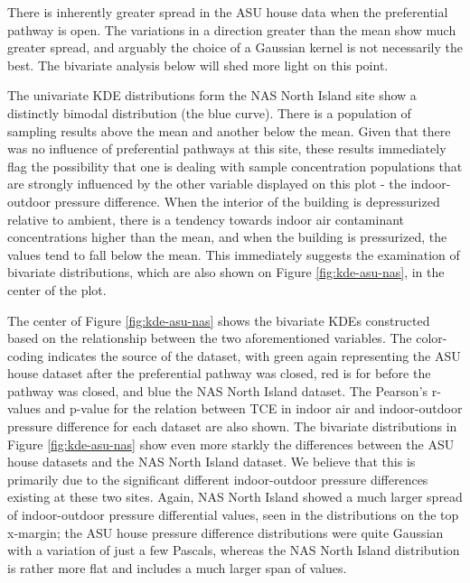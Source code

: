 \documentclass[journal=esthag,manuscript=article]{achemso}
\begin{document}
There is inherently greater spread in the ASU house data when the preferential pathway is open.
The variations in a direction greater than the mean show much greater spread, and arguably the choice of a Gaussian kernel is not necessarily the best.
The bivariate analysis below will shed more light on this point.

The univariate KDE distributions form the NAS North Island site show a distinctly bimodal distribution (the blue curve).
There is a population of sampling results above the mean and another below the mean.
Given that there was no influence of preferential pathways at this site, these results immediately flag the possibility that one is dealing with sample concentration populations that are strongly influenced by the other variable displayed on this plot - the indoor-outdoor pressure difference.
When the interior of the building is depressurized relative to ambient, there is a tendency towards indoor air contaminant concentrations higher than the mean, and when the building is pressurized, the values tend to fall below the mean.
This immediately suggests the examination of bivariate distributions, which are also shown on Figure \ref{fig:kde-asu-nas}, in the center of the plot.

The center of Figure \ref{fig:kde-asu-nas} shows the bivariate KDEs constructed based on the relationship between the two aforementioned variables.
The color-coding indicates the source of the dataset, with green again representing the ASU house dataset after the preferential pathway was closed, red is for before the pathway was closed, and blue the NAS North Island dataset.
The Pearson’s r-values and p-value for the relation between TCE in indoor air and indoor-outdoor pressure difference for each dataset are also shown.
The bivariate distributions in Figure \ref{fig:kde-asu-nas} show even more starkly the differences between the ASU house datasets and the NAS North Island dataset.
We believe that this is primarily due to the significant different indoor-outdoor pressure differences existing at these two sites.
Again, NAS North Island showed a much larger spread of indoor-outdoor pressure differential values, seen in the distributions on the top x-margin; the ASU house pressure difference distributions were quite Gaussian with a variation of just a few Pascals, whereas the NAS North Island distribution is rather more flat and includes a much larger span of values.
\end{document}
